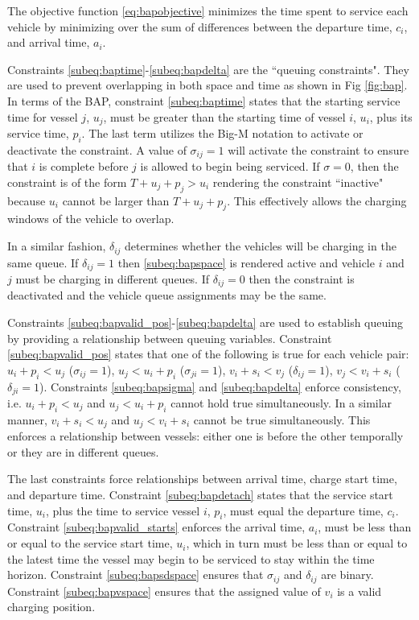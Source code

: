 \documentclass[letterpaper, 10pt, conference]{IEEEtran}
\begin{document}
The objective function \eqref{eq:bapobjective} minimizes the time spent to service each vehicle by minimizing over the sum of differences between the departure time, $c_i$, and arrival time, $a_i$.

Constraints \ref{subeq:baptime}-\ref{subeq:bapdelta} are the ``queuing constraints". They are used to prevent overlapping in both space and time as shown in Fig \ref{fig:bap}. In terms of the BAP, constraint \eqref{subeq:baptime} states that the starting service time for vessel $j$, $u_j$, must be greater than the starting time of vessel $i$, $u_i$, plus its service time, $p_i$. The last term utilizes the Big-M notation to activate or deactivate the constraint. A value of $\sigma_{ij} = 1$ will activate the constraint to ensure that $i$ is complete before $j$ is allowed to begin being serviced. If $\sigma = 0$, then the constraint is of the form $T + u_j + p_j > u_i$ rendering the constraint ``inactive" because $u_i$ cannot be larger than $T + u_j + p_j$. This effectively allows the charging windows of the vehicle to overlap.

In a similar fashion, $\delta_{ij}$ determines whether the vehicles will be charging in the same queue. If $\delta_{ij} = 1$ then \eqref{subeq:bapspace} is rendered active and vehicle $i$ and $j$ must be charging in different queues. If $\delta_{ij} = 0$ then the constraint is deactivated and the vehicle queue assignments may be the same.

Constraints \ref{subeq:bapvalid_pos}-\ref{subeq:bapdelta} are used to establish queuing by providing a relationship between queuing variables. Constraint \eqref{subeq:bapvalid_pos} states that one of the following is true for each vehicle pair: $u_i + p_i < u_j$ ($\sigma_{ij} = 1$), $u_j < u_i + p_i$ ($\sigma_{ji} = 1$), $v_i + s_i < v_j$ ($\delta_{ij} = 1$), $v_j < v_i + s_i$ ($\delta_{ji} = 1$). Constraints \eqref{subeq:bapsigma} and \eqref{subeq:bapdelta} enforce consistency, i.e. $u_i + p_i < u_j$ and $u_j < u_i + p_i$ cannot hold true simultaneously. In a similar manner, $v_i + s_i < u_j$ and $u_j < v_i + s_i$ cannot be true simultaneously. This enforces a relationship between vessels: either one is before the other temporally or they are in different queues.

The last constraints force relationships between arrival time, charge start time, and departure time. Constraint \eqref{subeq:bapdetach} states that the service start time, $u_i$, plus the time to service vessel $i$, $p_i$, must equal the departure time, $c_i$. Constraint \eqref{subeq:bapvalid_starts} enforces the arrival time, $a_i$, must be less than or equal to the service start time, $u_i$, which in turn must be less than or equal to the latest time the vessel may begin to be serviced to stay within the time horizon. Constraint \eqref{subeq:bapsdspace} ensures that $\sigma_{ij}$ and $\delta_{ij}$ are binary. Constraint \eqref{subeq:bapvspace} ensures that the assigned value of $v_i$ is a valid charging position.
\end{document}
